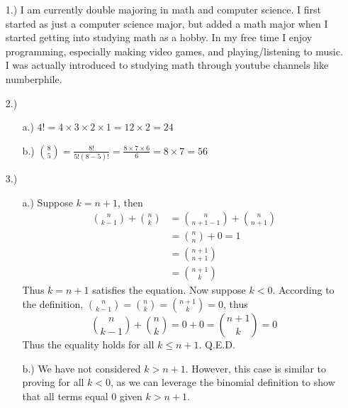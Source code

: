 \documentclass[12pt]{article}
\begin{document}
\pagestyle{fancy}
\fancyhead{}

\normalsize
\begin{itemize}
    \item [1.)] I am currently double majoring in math and computer science. I first started as just a computer science major, but added a math major when I started getting into studying math as a hobby. In my free time I enjoy programming, especially making video games, and playing/listening to music. I was actually introduced to studying math through youtube channels like numberphile.

    \item [2.)] \begin{itemize}
        \item [a.)] $4!=4\times3\times2\times1=12\times2=24$

        \item [b.)] $\binom{8}{5}=\frac{8!}{5!(8-5)!}=\frac{8\times7\times6}{6}=8\times7=56$
    \end{itemize}

    \item [3.)] \begin{itemize}
        \item [a.)] Suppose $k=n+1$, then
        \begin{align*}
            \binom{n}{k-1}+\binom{n}{k}&=\binom{n}{n+1-1}+\binom{n}{n+1}\\
            &=\binom{n}{n}+0=1\\
            &=\binom{n+1}{n+1}\\
            &=\binom{n+1}{k}
        \end{align*}
        Thus $k=n+1$ satisfies the equation. Now suppose $k<0$. According to the definition, $\binom{n}{k-1}=\binom{n}{k}=\binom{n+1}{k}=0$,
        thus
        \begin{equation*}
            \binom{n}{k-1}+\binom{n}{k}=0+0=\binom{n+1}{k}=0
        \end{equation*}
        Thus the equality holds for all $k\leq n+1$. Q.E.D.

        \item [b.)] We have not considered $k>n+1$. However, this case is similar to proving for all $k<0$, as we can leverage the binomial definition to show that all terms equal 0 given $k>n+1$.
    \end{itemize}


\end{itemize}
\end{document}
